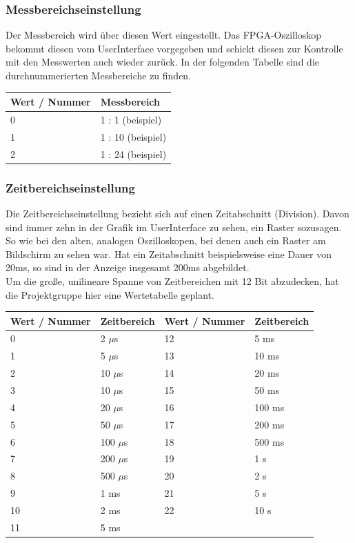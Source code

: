 \subsubsection{Messbereichseinstellung}
Der Messbereich wird über diesen Wert eingestellt. Das FPGA-Oszilloskop bekommt diesen vom UserInterface vorgegeben und schickt diesen zur Kontrolle mit den Messwerten auch wieder zurück. In der folgenden Tabelle sind die durchnummerierten Messbereiche zu finden.
\begin{tabular}[h]{l|l} %
	Wert / Nummer& Messbereich\\
	\hline\hline
	0 & 1 : 1 (beispiel)\\
	\hline
	1 & 1 : 10 (beispiel)\\
	\hline
	2 & 1 : 24  (beispiel)\\
\end{tabular}
\subsubsection{Zeitbereichseinstellung}\label{Zeitbereichseinstellung}
Die Zeitbereichseinstellung bezieht sich auf einen Zeitabschnitt (Division). Davon sind immer zehn in der Grafik im UserInterface zu sehen, ein Raster sozusagen. So wie bei den alten, analogen Oszilloskopen, bei denen auch ein Raster am Bildschirm zu sehen war. Hat ein Zeitabschnitt beispielsweise eine Dauer von 20ms, so sind in der Anzeige insgesamt 200ms abgebildet.\\Um die große, unilineare Spanne von Zeitbereichen mit 12 Bit abzudecken, hat die Projektgruppe hier eine Wertetabelle geplant.\\
\begin{tabular}[h]{l|l||l|l} %
	Wert / Nummer& Zeitbereich & Wert / Nummer& Zeitbereich\\
	\hline\hline
	0 & 2 $\mu$s & 12 & 5 ms\\
	\hline
	1 & 5 $\mu$s & 13 & 10 ms\\
	\hline
	2 & 10 $\mu$s & 14 & 20 ms\\
	\hline
	3 & 10 $\mu$s & 15 & 50 ms\\
	\hline
	4 & 20 $\mu$s &16 & 100 ms\\
	\hline
	5 & 50 $\mu$s &17 & 200 ms\\
	\hline
	6 & 100 $\mu$s &18 & 500 ms\\
	\hline
	7 & 200 $\mu$s & 19 & 1 s\\
	\hline
	8 & 500 $\mu$s & 20 & 2 s\\
	\hline
	9 & 1 ms  & 21 & 5 s\\
	\hline
	10 & 2 ms & 22 & 10 s\\
	\hline
	11 & 5 ms & & \\
\end{tabular}

